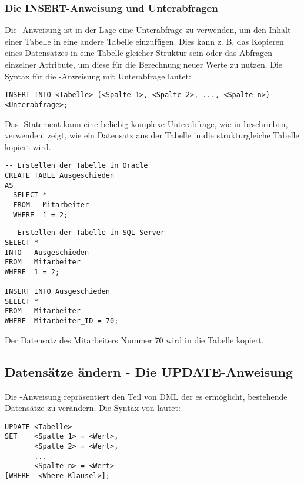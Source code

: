\subsubsection{Die INSERT-Anweisung und Unterabfragen}
Die \INSERT-Anweisung ist in der Lage eine Unterabfrage zu verwenden,
um den Inhalt einer Tabelle in eine andere Tabelle einzufügen. Dies
kann z. B. das Kopieren eines Datensatzes in eine Tabelle gleicher
Struktur sein oder das Abfragen einzelner Attribute, um diese für
die Berechnung neuer Werte zu nutzen. Die Syntax für die
\INSERT-Anweisung mit Unterabfrage lautet:
\begin{lstlisting}[language=oracle_sql,caption={Die \INSERT-Anweisung mit Unterabfrage},label=sql07_07]
INSERT INTO <Tabelle> (<Spalte 1>, <Spalte 2>, ..., <Spalte n>)
<Unterabfrage>;
          \end{lstlisting}
Das \INSERT-Statement kann eine beliebig komplexe Unterabfrage, wie in
 beschrieben, verwenden. 
zeigt, wie ein Datensatz aus der Tabelle  in
die strukturgleiche Tabelle  kopiert wird.
\begin{lstlisting}[language=oracle_sql,caption={Die \INSERT-Anweisung
      mit Unterabfrage},label=sql07_08]
-- Erstellen der Tabelle in Oracle
CREATE TABLE Ausgeschieden
AS
  SELECT *
  FROM   Mitarbeiter
  WHERE  1 = 2;
          \end{lstlisting}
\clearpage
\begin{lstlisting}[language=oracle_sql]
-- Erstellen der Tabelle in SQL Server
SELECT *
INTO   Ausgeschieden
FROM   Mitarbeiter
WHERE  1 = 2;

INSERT INTO Ausgeschieden
SELECT *
FROM   Mitarbeiter
WHERE  Mitarbeiter_ID = 70;
          \end{lstlisting}
Der Datensatz des Mitarbeiters Nummer 70 wird in die Tabelle
 kopiert.
\subsection{Datensätze ändern - Die UPDATE-Anweisung}
Die \UPDATE-Anweisung repräsentiert den Teil von DML der es
ermöglicht, bestehende Datensätze zu verändern. Die Syntax von
\UPDATE{} lautet:
\begin{lstlisting}[language=oracle_sql,caption={Die Syntax des \UPDATE-Kommandos},label=sql07_09]
UPDATE <Tabelle>
SET    <Spalte 1> = <Wert>,
       <Spalte 2> = <Wert>,
       ...
       <Spalte n> = <Wert>
[WHERE  <Where-Klausel>];
        \end{lstlisting}

